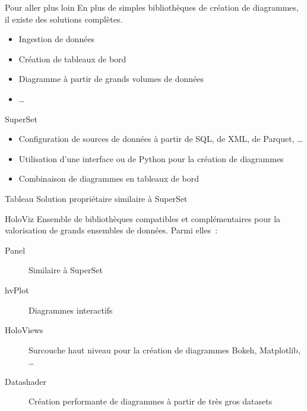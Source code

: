 \begin{frame}{Pour aller plus loin}
  En plus de simples bibliothèques de création de diagrammes, il existe des solutions complètes.

  \begin{itemize}
    \item Ingestion de données
    \item Création de tableaux de bord
    \item Diagramme à partir de grands volumes de données
    \item …
  \end{itemize}
\end{frame}

\begin{frame}{SuperSet}
  \begin{itemize}
    \item Configuration de sources de données à partir de SQL, de XML, de Parquet, …
    \item Utilisation d'une interface ou de Python pour la création de diagrammes
    \item Combinaison de diagrammes en tableaux de bord
  \end{itemize}
\end{frame}

\begin{frame}{Tableau}
  Solution propriétaire similaire à SuperSet
\end{frame}

\begin{frame}{HoloViz}
  Ensemble de bibliothèques compatibles et complémentaires pour la valorisation de grands ensembles de données. Parmi elles~:

  \begin{description}
    \item[Panel] Similaire à SuperSet
    \item[hvPlot] Diagrammes interactifs
    \item[HoloViews] Surcouche haut niveau pour la création de diagrammes Bokeh, Matplotlib, …
    \item[Datashader] Création performante de diagrammes à partir de très gros datasets
  \end{description}
\end{frame}
